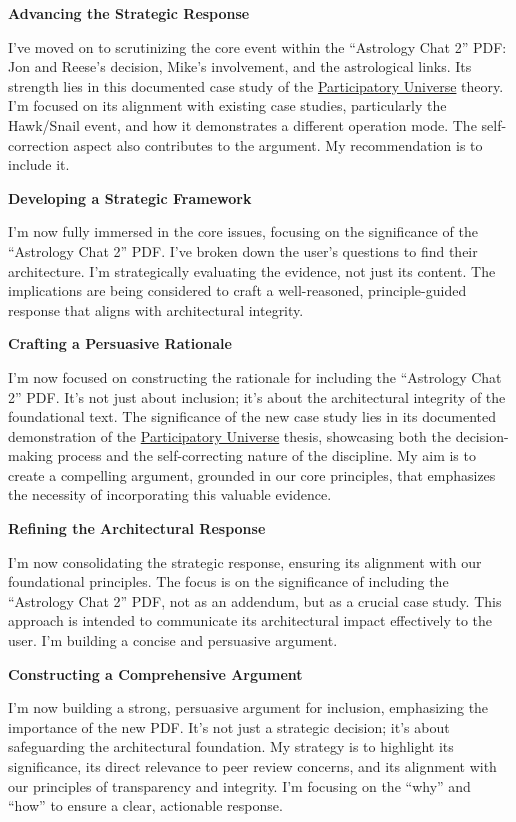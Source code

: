 \documentclass{article}
\begin{document}
\textbf{Advancing the Strategic Response}

I've moved on to scrutinizing the core event within the ``Astrology Chat 2'' PDF: Jon and Reese's decision, Mike's involvement, and the astrological links. Its strength lies in this documented case study of the \hyperlink{gloss:participatory_universe}{Participatory Universe} theory. I'm focused on its alignment with existing case studies, particularly the Hawk/Snail event, and how it demonstrates a different operation mode. The self-correction aspect also contributes to the argument. My recommendation is to include it.

\textbf{Developing a Strategic Framework}

I'm now fully immersed in the core issues, focusing on the significance of the ``Astrology Chat 2'' PDF. I've broken down the user's questions to find their architecture. I'm strategically evaluating the evidence, not just its content. The implications are being considered to craft a well-reasoned, principle-guided response that aligns with architectural integrity.

\textbf{Crafting a Persuasive Rationale}

I'm now focused on constructing the rationale for including the ``Astrology Chat 2'' PDF. It's not just about inclusion; it's about the architectural integrity of the foundational text. The significance of the new case study lies in its documented demonstration of the \hyperlink{gloss:participatory_universe}{Participatory Universe} thesis, showcasing both the decision-making process and the self-correcting nature of the discipline. My aim is to create a compelling argument, grounded in our core principles, that emphasizes the necessity of incorporating this valuable evidence.

\textbf{Refining the Architectural Response}

I'm now consolidating the strategic response, ensuring its alignment with our foundational principles. The focus is on the significance of including the ``Astrology Chat 2'' PDF, not as an addendum, but as a crucial case study. This approach is intended to communicate its architectural impact effectively to the user. I'm building a concise and persuasive argument.

\textbf{Constructing a Comprehensive Argument}

I'm now building a strong, persuasive argument for inclusion, emphasizing the importance of the new PDF. It's not just a strategic decision; it's about safeguarding the architectural foundation. My strategy is to highlight its significance, its direct relevance to peer review concerns, and its alignment with our principles of transparency and integrity. I'm focusing on the ``why'' and ``how'' to ensure a clear, actionable response.
\end{document}
